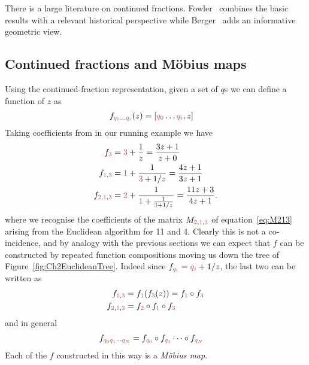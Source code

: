 There is a large literature on continued fractions. Fowler~\cite{fowlerMathematicsPlatoAcademy1999} combines the basic results with a relevant historical perspective while Berger~\cite{bergerGeometryRevealedJacob2010} adds an informative geometric view. 

\subsection{Continued fractions and M\"obius maps}
Using the continued-fraction representation, given a set of $q$s we can define a function of $z$ as
\begin{align}
	f_{\jqix{0}\ldots \jqix{i}}(z) &= [\jqix{0}\ldots \jqix{i}  , z] 
\end{align}
Taking coefficients from in our running example we  have 
\begin{align}
f_{\jqn{3}}&=  \jqn{3} + \frac{1}{z} = \frac{3 z+1}{z+0} 
\\
f_{\jqn{1},\jqn{3}}  &=  \jqn{1} + \frac{1}{\jqn{3}+1/z} = \frac{4 z+1}{3z+1} \label{eq:fq}
\\ 
f_{\jqn{2},\jqn{1},\jqn{3}}  &=  \jqn{2} + \frac{1}{\jqn{1}+\frac{1}{
		\jqn{3}+1/z}} = \frac{11 z+3}{4z+1} \label{eq:frac411}.
\end{align}
where we recognise the coefficients of the matrix $M_{\jqn{2},\jqn{1},\jqn{3}}$ of equation~\ref{eq:M213} arising from the Euclidean algorithm for 11 and 4. Clearly this is not a co-incidence, and by analogy with the previous sections we can expect that $f$ can be constructed by repeated function compositions moving us down the tree of Figure~\ref{fig:Ch2EuclideanTree}. 
Indeed since $	f_{\jqix{i}}  =  \jqix{i} +1/{z}  $, the last two can be written as
\begin{align}	
	f_{\jqn{1},\jqn{3}}  &=  	f_{\jqn{1}}(	f_{\jqn{3}}(z)) = 	f_{\jqn{1}}\circ 	f_{\jqn{3}}
	\\	f_{\jqn{2},\jqn{1},\jqn{3}}  &=
	 f_{\jqn{2}}\circ 	f_{\jqn{1}} \circ 	f_{\jqn{3}}
\end{align}
and in general
\begin{align}
	f_{\jqix{0}\jqix{1}\cdots\jqix{N}} &= 	f_{\jqix{0}}\circ f_{\jqix{1}}\cdots\circ f_{\jqix{N}}
\end{align}
Each of the $f$ constructed in this way is a \textit{M\"obius map}.


